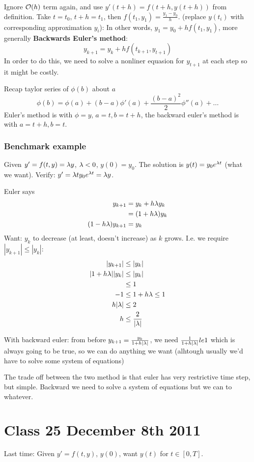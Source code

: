 Ignore $\mathcal{O}(h)$ term again, and use $y'(t+h) = f(t+h, y(t+h))$ from
definition. Take $t=t_0$, $t+h = t_1$, then $f(t_1, y_1) =
\frac{y_1-y_0}{h}$. (replace $y(t_i)$ with corresponding approximation $y_i$):
In other words, $y_1 = y_0 + hf(t_1,y_1)$, more generally
\textbf{Backwards Euler's method}: $$y_{k+1}
= y_k + hf(t_{k+1},y_{t+1})$$
In order to do this, we need to solve a nonliner equasion for
$y_{t+1}$ at each step so it might be costly.

Recap taylor series of $\phi(b)$ about $a$
$$\phi(b) = \phi(a) + (b-a)\phi'(a) + \frac{(b-a)^2}{2}\phi''(a) +
\dots$$
Euler's method is with $\phi=y$, $a = t, b=t+h$, the backward euler's
method is with $a=t+h,b=t$.

\subsubsection{Benchmark example}
Given $y' = f(t,y) = \lambda y$, $\lambda < 0$, $y(0)=y_0$. The solution is $y(t) = y_0e^{\lambda t}$ (what we want). Verify:
$y' = \lambda t y_0e^{\lambda t} = \lambda y$.

Euler says 
\begin{align*}
y_{k+1} &= y_k + h \lambda y_k  \\
&= (1+h\lambda) y_k\\
(1-h\lambda)y_{k+1} &= y_k
\end{align*}
Want: $y_k$ to decrease (at least, doesn't increase) as $k$ grows.
I.e. we require $|y_{k+1}| \le |y_k|$:
\begin{align*}
  |y_{k+1}| &\le |y_k|\\
|1+h\lambda||y_k| &\le |y_k|\\
&\le 1\\
-1 &\le 1+h\lambda \le 1\\
h|\lambda| &\le 2\\
h &\le \frac{2}{|\lambda|}
\end{align*}

With backward euler:
from before $y_{k+1} = \frac{y_k}{1+h|\lambda|}$, we need
$\frac{1}{1+h|\lambda|} le 1$ which is always going to be true, so we can
do anything we want (alhtough usually we'd have to solve some system
of equations)

The trade off between the two method is that euler has very
restrictive time step, but simple. Backward we need to solve a system
of equations but we can to whatever.
\pagebreak

\section{Class 25 December 8th 2011}
Last time: Given $y' = f(t,y)$, $y(0)$, want $y(t)$ for $t\in [0,T]$.

